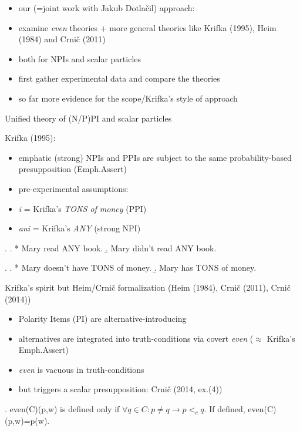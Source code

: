 \documentclass[ignorenonframetext,]{beamer}
\providecommand{\tightlist}{%
  \setlength{\itemsep}{0pt}\setlength{\parskip}{0pt}}
\begin{document}
\begin{frame}

\begin{itemize}
\tightlist
\item
  our (=joint work with Jakub Dotlačil) approach:
\item
  examine \emph{even} theories + more general theories like Krifka
  (1995), Heim (1984) and Crnič (2011)
\item
  both for NPIs and scalar particles
\item
  first gather experimental data and compare the theories
\item
  so far more evidence for the scope/Krifka's style of approach
\end{itemize}

\end{frame}

\begin{frame}{Unified theory of (N/P)PI and scalar particles}

Krifka (1995):

\begin{itemize}
\tightlist
\item
  emphatic (strong) NPIs and PPIs are subject to the same
  probability-based presupposition (Emph.Assert)
\item
  pre-experimental assumptions:
\item
  \emph{i} = Krifka's \emph{TONS of money} (PPI)
\item
  \emph{ani} = Krifka's \emph{ANY} (strong NPI)
\end{itemize}

\ex. \a. * Mary read ANY book. \b. Mary didn't read ANY book.

\ex. \a. * Mary doesn't have TONS of money. \b. Mary has TONS of money.

\end{frame}

\begin{frame}

Krifka's spirit but Heim/Crnič formalization (Heim (1984), Crnič (2011),
Crnič (2014))

\begin{itemize}
\tightlist
\item
  Polarity Items (PI) are alternative-introducing
\item
  alternatives are integrated into truth-conditions via covert
  \emph{even} (\(\approx\) Krifka's Emph.Assert)
\item
  \emph{even} is vacuous in truth-conditions
\item
  but triggers a scalar presupposition: Crnič (2014, ex.(4))
\end{itemize}

\ex. even(C)(p,w) is defined only if
\(\forall q \in C: p \neq q \rightarrow p <_c q\). If defined,
even(C)(p,w)=p(w).

\end{frame}
\end{document}
